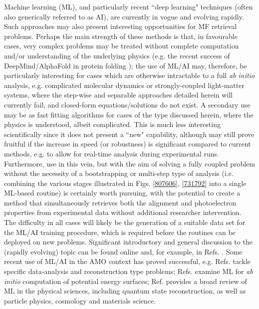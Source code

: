 Machine learning (ML), and particularly recent ``deep learning" techniques (often also generically referred to as AI), are currently in vogue and evolving rapidly. Such approaches may also present interesting opportunities for MF retrieval problems. Perhaps the main strength of these methods is that, in favourable cases, very complex problems may be treated without complete computation and/or understanding of the underlying physics (e.g. the recent success of DeepMind/AlphaFold in protein folding \cite{eisenstein2021ArtificialIntelligencePowers,jumper2021HighlyAccurateProtein}); the use of ML/AI may, therefore, be particularly interesting for cases which are otherwise intractable to a full \textit{ab initio} analysis, e.g. complicated molecular dynamics or strongly-coupled light-matter systems, where the step-wise and separable approaches detailed herein will currently fail, and closed-form equations/solutions do not exist. A secondary use may be as fast fitting algorithms for cases of the type discussed herein, where the physics is understood, albeit complicated. This is much less interesting scientifically since it does not present a ``new" capability, although may still prove fruitful if the increase in speed (or robustness) is significant compared to current methods, e.g. to allow for real-time analysis during experimental runs. Furthermore, use in this vein, but with the aim of solving a fully coupled problem without the necessity of a bootstrapping or multi-step type of analysis (i.e. combining the various stages illustrated in Figs. \ref{807606}, \ref{731792} into a single ML-based routine) is certainly worth pursuing, with the potential to create a method that simultaneously retrieves both the alignment and photoelectron properties from experimental data without additional researcher intervention. The difficulty in all cases will likely be the generation of a suitable data set for the ML/AI training procedure, which is required before the routines can be deployed on new problems. Significant introductory and general discussion to the (rapidly evolving) topic can be found online and, for example, in Refs. \cite{LeCun2015,carleo2019MachineLearningPhysical,davies2021AdvancingMathematicsGuiding}. Some recent use of ML/AI in the AMO context has proved successful, e.g. Refs. \cite{he2022FilmingMoviesAttosecond,hegazy2022BayesianInferencingDeterministic} tackle specific data-analysis and reconstruction type problems; Refs. \cite{lu2022FastInitioPotential,nandi2021DmachineLearningPotential} examine ML for \textit{ab initio} computation of potential energy surfaces; Ref. \cite{carleo2019MachineLearningPhysical} provides a broad review of ML in the physical sciences, including quantum state reconstruction, as well as particle physics, cosmology and materials science.

